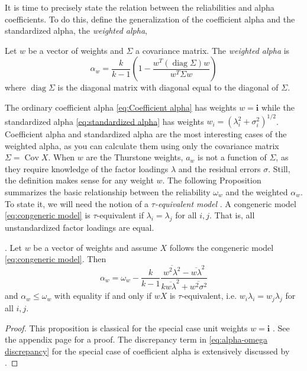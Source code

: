 \documentclass[twoside]{article}
\DeclareMathOperator{\Cov}{Cov}
\DeclareMathOperator{\diag}{diag}
\renewcommand{\sqrt}[1]{{(#1)^{1/2}}}
\begin{document}
It is time to precisely state the relation between the reliabilities and alpha coefficients. To do this, define the generalization of the coefficient alpha and the standardized alpha, the \textit{weighted alpha},

\begin{defn}
Let $w$ be a vector of weights and $\Sigma$ a covariance matrix. The \textit{weighted alpha} is
\begin{equation}
\alpha_{w}=\frac{k}{k-1}\left(1-\frac{w^{T}(\diag\Sigma)w}{w^{T}\Sigma w}\right)\label{eq:weighted alpha}
\end{equation}
where $\diag\Sigma$ is the diagonal matrix with diagonal equal to the diagonal of $\Sigma$.
\end{defn}
The ordinary coefficient alpha \eqref{eq:Coefficient alpha} has weights $w=\mathbf{i}$
while the standardized alpha \eqref{eq:standardized alpha} has weights $w_{i}=\sqrt{\lambda_{i}^{2}+\sigma_{i}^{2}}$. Coefficient alpha and standardized alpha are the most interesting cases of the weighted alpha, as you can calculate them using only the covariance matrix $\Sigma = \Cov X$. When $w$ are the Thurstone weights, $a_w$ is not a function of $\Sigma$, as they require knowledge of the factor loadings $\lambda$ and the residual errors $\sigma$. Still, the definition makes sense for any weight $w$. The following Proposition summarizes the basic relationship
between the reliability $\omega_{w}$ and the weighted $\alpha_{w}$. To state it, we will need
the notion of a \textit{$\tau$-equivalent model} \citep[][section 2.13]{Lord1968-ax}. A congeneric model \eqref{eq:congeneric model} is $\tau$-equivalent if $\lambda_{i}=\lambda_{j}$ for all $i,j$. That is, all unstandardized
factor loadings are equal.
\begin{prop}
\label{prop:weighted alpha}. Let $w$ be a vector of weights and
assume $X$ follows the congeneric model \eqref{eq:congeneric model}. Then 
\begin{equation}
\alpha_{w}=\omega_{w}-\frac{k}{k-1}\frac{\overline{w^{2}\lambda^{2}}-\overline{w\lambda}^{2}}{k\overline{w\lambda}^{2}+\overline{w^{2}\sigma^{2}}}\label{eq:alpha-omega discrepancy}
\end{equation}
and $\alpha_w \leq \omega_w$ with equality if and only if $wX$ is $\tau$-equivalent, i.e. $w_i\lambda_{i}=w_j\lambda_{j}$
for all $i,j$.
\end{prop}
\begin{proof}
This proposition is classical for the special case unit weights $w = \mathbf{i}$ \citep[][pp. 87 -- 89]{Lord1968-ax}. See the appendix page \pageref{proof:weighted alpha}
for a proof. The discrepancy term in \eqref{eq:alpha-omega discrepancy} for the special case of coefficient alpha is extensively discussed by \citet{Raykov1997-bu}. 
\end{proof}
\end{document}
